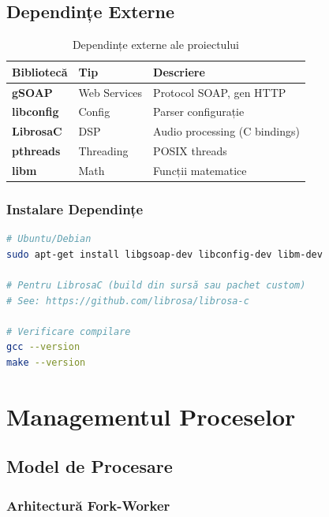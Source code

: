 \documentclass[12pt,a4paper,oneside]{book}
\begin{document}
\section{Dependințe Externe}

\begin{table}[H]
\centering
\begin{tabularx}{\textwidth}{|l|l|X|}
\hline
\textbf{Bibliotecă} & \textbf{Tip} & \textbf{Descriere} \\
\hline
\textbf{gSOAP} & Web Services & Protocol SOAP, gen HTTP \\
\hline
\textbf{libconfig} & Config & Parser configurație \\
\hline
\textbf{LibrosaC} & DSP & Audio processing (C bindings) \\
\hline
\textbf{pthreads} & Threading & POSIX threads \\
\hline
\textbf{libm} & Math & Funcții matematice \\
\hline
\end{tabularx}
\caption{Dependințe externe ale proiectului}
\end{table}

\subsection{Instalare Dependințe}

\begin{lstlisting}[language=bash]
# Ubuntu/Debian
sudo apt-get install libgsoap-dev libconfig-dev libm-dev

# Pentru LibrosaC (build din sursă sau pachet custom)
# See: https://github.com/librosa/librosa-c

# Verificare compilare
gcc --version
make --version
\end{lstlisting}

\newpage

\chapter{Managementul Proceselor}

\section{Model de Procesare}

\subsection{Arhitectură Fork-Worker}
\end{document}
